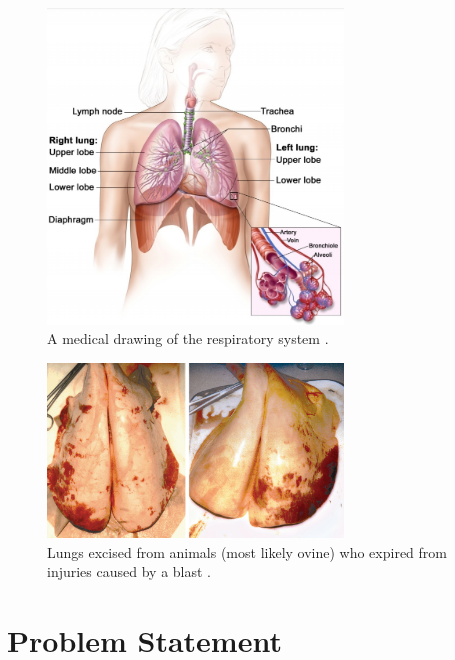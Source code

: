 \begin{figure}
    \centering
    \includegraphics[width=0.7\textwidth]{figures/theRespiratorySystem.png}
    \caption{A medical drawing of the respiratory system \cite{Josey10}.}
    \label{figLungDrawing}
\end{figure}

\begin{figure}
    \centering
    \includegraphics[width=0.7\textwidth]{figures/lungInjuryResultingFromBlast.png}
    \caption{Lungs excised from animals (most likely ovine) who expired from injuries caused by a blast \cite{Stuhmiller08}.}
    \label{figDamagedLung}
\end{figure}

\section{Problem Statement}

